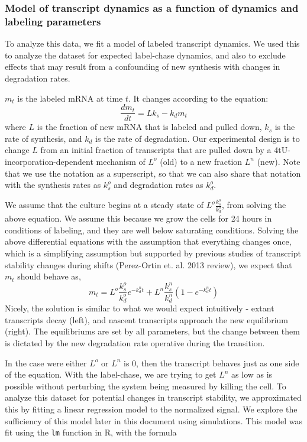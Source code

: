 \subsubsection{Model of transcript dynamics as a function of 
dynamics and labeling parameters}

To analyze this data, we fit a model of 
labeled transcript dynamics.
We used this to analyze the dataset for expected label-chase
dynamics, and also to exclude effects that may result from a
confounding of new synthesis with changes in degradation rates.

\(m_t\) is the labeled mRNA at time \(t\). It changes according to the
equation: \[ \frac{d m_t}{dt} = L k_s - k_d m_t\] where \(L\) is the
fraction of new mRNA that is labeled and pulled down, \(k_s\) is the
rate of synthesis, and \(k_d\) is the rate of degradation. Our
experimental design is to change \(L\) from an initial fraction of
transcripts that are pulled down by a 4tU-incorporation-dependent
mechanism of \(L^o\) (old) to a new fraction \(L^n\) (new). Note that we
use the notation as a superscript, so that we can also share that
notation with the synthesis rates as \(k_s^o\) and degradation rates as
\(k_d^o\).

We assume that the culture begins at a steady state of
\(L^{o}\frac{k_s^{o}}{k_d^{o}}\), from solving the above equation.
We assume this because we grow the cells for 24 hours in conditions
of labeling, and they are well below saturating conditions.
Solving the above differential equations with the assumption that
everything changes once, which is a simplifying assumption but supported
by previous studies of transcript stability changes during shifts
(Perez-Ortin et. al. 2013 review), we expect that \(m_t\) should behave
as, \[ m_t = L^o \frac{k_s^o}{k_d^o} e^{-k_d^n t} + 
  L^n\frac{k_s^n}{k_d^n}(1-e^{-k_d^n t}) \] Nicely, the solution is
similar to what we would expect intuitively - extant transcripts decay
(left), and nascent transcripts approach the new equilibrium (right).
The equilibriums are set by all parameters, but the change between them
is dictated by the new degradation rate operative during the transition.

In the case were either \(L^o\) or \(L^n\) is 0, then the transcript
behaves just as one side of the equation. With the label-chase, we are
trying to get \(L^n\) as low as is possible without perturbing the
system being measured by killing the cell.
To analyze this dataset for potential changes in transcript stability,
we approximated this by fitting a linear regression model to the
normalized signal. We explore the sufficiency of this model later in
this document using simulations. This model was fit using the
\texttt{lm} function in R, with the formula

